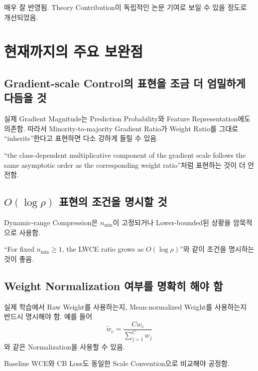 \documentclass[11pt,a4paper]{article}
\begin{document}
\begin{tcolorbox}[title=반영 평가]
매우 잘 반영됨. Theory Contribution이 독립적인 논문 기여로 보일 수 있을 정도로 개선되었음.
\end{tcolorbox}

\section{현재까지의 주요 보완점}

\subsection{Gradient-scale Control의 표현을 조금 더 엄밀하게 다듬을 것}

실제 Gradient Magnitude는 Prediction Probability와 Feature Representation에도 의존함. 따라서 Minority-to-majority Gradient Ratio가 Weight Ratio를 그대로 ``inherits''한다고 표현하면 다소 강하게 들릴 수 있음.

\begin{tcolorbox}[title=수정 권장]
``the class-dependent multiplicative component of the gradient scale follows the same asymptotic order as the corresponding weight ratio''처럼 표현하는 것이 더 안전함.
\end{tcolorbox}

\subsection{\(O(\log \rho)\) 표현의 조건을 명시할 것}

Dynamic-range Compression은 \(n_{\min}\)이 고정되거나 Lower-bounded된 상황을 암묵적으로 사용함.

\begin{tcolorbox}[title=수정 권장]
``For fixed \(n_{\min}\geq1\), the LWCE ratio grows as \(O(\log \rho)\)''와 같이 조건을 명시하는 것이 좋음.
\end{tcolorbox}

\subsection{Weight Normalization 여부를 명확히 해야 함}

실제 학습에서 Raw Weight를 사용하는지, Mean-normalized Weight를 사용하는지 반드시 명시해야 함. 예를 들어
\[
\widetilde{w}_c
=
\frac{Cw_c}{\sum_{j=1}^{C}w_j}
\]
와 같은 Normalization을 사용할 수 있음.

\begin{tcolorbox}[title=중요한 질문]
Baseline WCE와 CB Loss도 동일한 Scale Convention으로 비교해야 공정함.
\end{tcolorbox}
\end{document}
